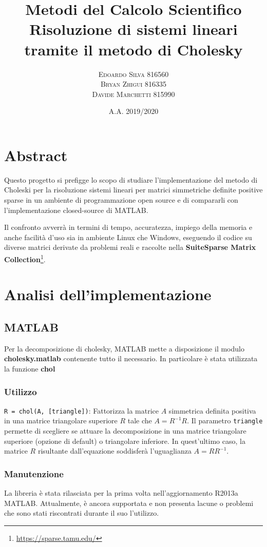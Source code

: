 \documentclass[11pt,italian]{article}
\title{
    Metodi del Calcolo Scientifico \\
    \normalsize Risoluzione di sistemi lineari tramite il metodo di Cholesky \\
}
\date{\small A.A. 2019/2020}
\author{
    \normalsize
    \textsc{Edoardo Silva} 816560 \\
    \normalsize
    \textsc{Bryan Zhigui} 816335 \\
    \normalsize
    \textsc{Davide Marchetti} 815990
}
\begin{document}
\maketitle

\section*{Abstract}
Questo progetto si prefigge lo scopo di studiare l'implementazione del metodo di Choleski per la risoluzione sistemi lineari per matrici simmetriche definite positive sparse in un ambiente di programmazione open source e di compararli con l'implementazione closed-source di MATLAB.

Il confronto avverrà in termini di tempo, accuratezza, impiego della memoria e anche facilità d'uso sia in ambiente Linux che Windows, eseguendo il codice su diverse matrici derivate da problemi reali e raccolte nella \textbf{SuiteSparse Matrix Collection}\footnote{\url{https://sparse.tamu.edu/}}.

\newpage
\section{Analisi dell'implementazione}

\subsection{MATLAB}
Per la decomposizione di cholesky, MATLAB mette a disposizione il modulo \textbf{cholesky.matlab} contenente tutto il necessario. In particolare è stata utilizzata la funzione \textbf{chol}

\subsubsection*{Utilizzo}
\lstinline{R = chol(A, [triangle])}: Fattorizza la matrice $A$ simmetrica definita positiva in una matrice triangolare superiore $R$ tale che $A=R^{-1}R$.
Il parametro \lstinline{triangle} permette di scegliere se attuare la decomposizione in una matrice triangolare superiore (opzione di default) o triangolare inferiore. In quest'ultimo caso, la matrice $R$ risultante dall'equazione soddisferà l'uguaglianza $A = RR^{-1}$.

\subsubsection*{Manutenzione}
La libreria è stata rilasciata per la prima volta nell'aggiornamento R2013a MATLAB. Attualmente, è ancora supportata e non presenta lacune o problemi che sono stati riscontrati durante il suo l'utilizzo.
\end{document}
